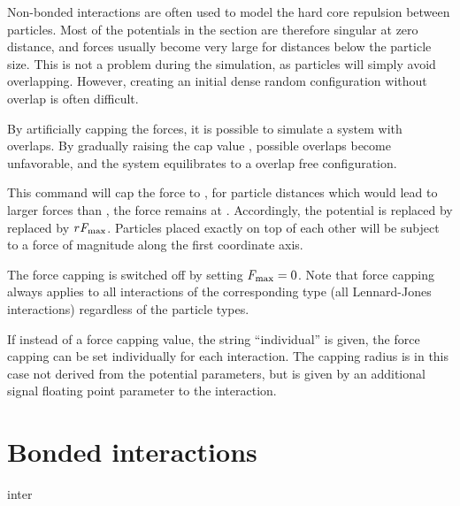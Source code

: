 Non-bonded interactions are often used to model the hard core
repulsion between particles. Most of the potentials in the section are
therefore singular at zero distance, and forces usually become very
large for distances below the particle size. This is not a problem
during the simulation, as particles will simply avoid overlapping.
However, creating an initial dense random configuration without
overlap is often difficult.

By artificially capping the forces, it is possible to simulate a
system with overlaps. By gradually raising the cap value
, possible overlaps become unfavorable, and the
system equilibrates to a overlap free configuration.

This command will cap the force to , \ie for
particle distances which would lead to larger forces than
, the force remains at .
Accordingly, the potential is replaced by replaced by $r
\mathrm{\mathit{F_\mathrm{max}}}$. Particles placed exactly on top of each other
will be subject to a force of magnitude  along
the first coordinate axis.

The force capping is switched off by setting $\mathrm{\mathit{F_\mathrm{max}}}=0$.
Note that force capping always applies to all interactions of the
corresponding type (\eg all Lennard-Jones interactions) regardless of
the particle types.

If instead of a force capping value, the string ``individual'' is
given, the force capping can be set individually for each
interaction. The capping radius is in this case not derived from the
potential parameters, but is given by an additional signal floating
point parameter to the interaction.

\section{Bonded interactions}
\label{sec:inter-bonded}

\begin{essyntax*}
  inter 
\end{essyntax*}

